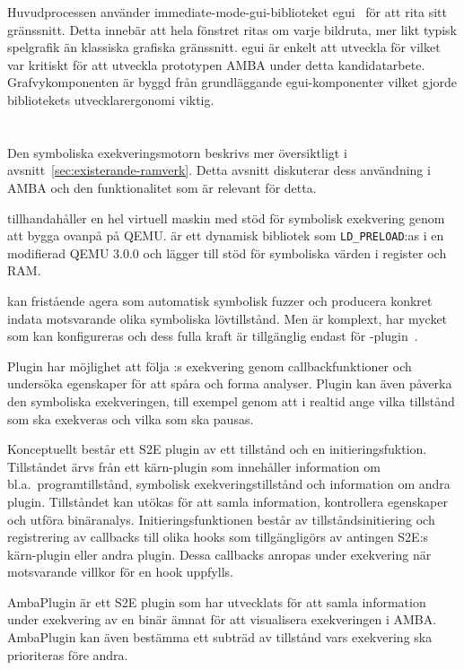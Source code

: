 Huvudprocessen använder immediate-mode-gui-biblioteket egui~\cite{egui} för att
rita sitt gränssnitt. Detta innebär att hela fönstret ritas om varje bildruta,
mer likt typisk spelgrafik än klassiska grafiska gränssnitt. egui är enkelt att
utveckla för vilket var kritiskt för att utveckla prototypen AMBA under detta
kandidatarbete. Grafvykomponenten är byggd från grundläggande egui-komponenter
vilket gjorde bibliotekets utvecklarergonomi viktig.

\section{\stoe{}}

Den symboliska exekveringsmotorn \stoe{} beskrivs mer översiktligt i
avsnitt~\ref{sec:existerande-ramverk}. Detta avsnitt diskuterar dess användning
i AMBA och den funktionalitet som är relevant för detta.\@

\stoe{} tillhandahåller en hel virtuell maskin med stöd för symbolisk exekvering
genom att bygga ovanpå på QEMU.\@ \stoe{} är ett dynamisk bibliotek som
\verb|LD_PRELOAD|:as i en modifierad QEMU 3.0.0 och lägger till stöd för
symboliska värden i register och RAM.\@

\stoe{} kan fristående agera som automatisk symbolisk fuzzer och producera
konkret indata motsvarande olika symboliska lövtillstånd. Men \stoe{} är
komplext, har mycket som kan konfigureras och dess fulla kraft är tillgänglig
endast för \stoe{}-plugin~\cite{Chipounov12}.

Plugin har möjlighet att följa \stoe{}:s exekvering genom callbackfunktioner och
undersöka egenskaper för att spåra och forma analyser. Plugin kan även påverka
den symboliska exekveringen, till exempel genom att i realtid ange vilka
tillstånd som ska exekveras och vilka som ska pausas.

Konceptuellt består ett S2E plugin av ett tillstånd och en initieringsfuktion.
Tillståndet ärvs från ett kärn-plugin som innehåller information om bl.a.\
programtillstånd, symbolisk exekveringstillstånd och information om andra
plugin. Tillståndet kan utökas för att samla information, kontrollera egenskaper
och utföra binäranalys. Initieringsfunktionen består av tillståndsinitiering och
registrering av callbacks till olika hooks som tillgängligörs av antingen S2E:s
kärn-plugin eller andra plugin. Dessa callbacks anropas under exekvering när
motsvarande villkor för en hook uppfylls.

AmbaPlugin är ett S2E plugin som har utvecklats för att samla information under
exekvering av en binär ämnat för att visualisera exekveringen i AMBA.\@
AmbaPlugin kan även bestämma ett subträd av tillstånd vars exekvering ska
prioriteras före andra.

